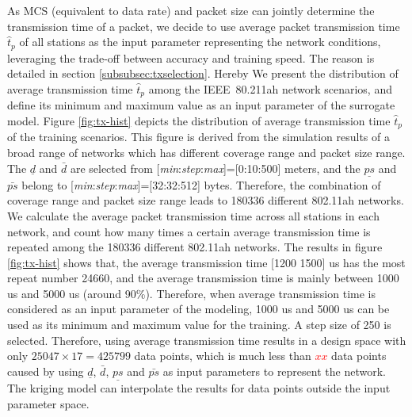 



As MCS (equivalent to data rate) and packet size can jointly determine the transmission time of a packet, we decide to use average packet transmission time $\hat{t}_p$ of all stations as the input parameter representing the network conditions, leveraging the trade-off between accuracy and training speed. %
The reason is detailed in section \ref{subsubsec:txselection}. Hereby We present the distribution of average transmission time $\hat{t}_p$ among the IEEE~80.211ah network scenarios, and define its minimum and maximum value as an input parameter of the surrogate model. Figure \ref{fig:tx-hist} depicts the 
distribution of average transmission time $\hat{t}_p$ of the training scenarios.  This figure is derived from the simulation results of a broad range of networks which has different coverage range and packet size range. The $\underline{d}$ and $\bar{d}$ are selected from [\textit{min}:\textit{step}:\textit{max}]=[0:10:500] meters, and the $\underline{ps}$ and $\bar{ps}$ belong to  [\textit{min}:\textit{step}:\textit{max}]=[32:32:512] bytes. Therefore, the combination of coverage range and packet size range  leads to 180336 different 802.11ah networks. We calculate the average packet transmission time across all stations in each network, and count how many times a certain average transmission time is repeated among the 180336 different 802.11ah networks.
 The results in figure \ref{fig:tx-hist} shows that, the average transmission time [1200 1500] us has the most repeat number 24660,  and the average transmission time is mainly between 1000 us and 5000 us (around 90\%). Therefore,  when average transmission time is considered as an input parameter of the modeling, 1000 us and 5000 us can be used as its minimum and maximum value for the training. A step size of 250 is selected. Therefore, using average transmission time results in a design space with only $25047 \times 17 = 425799$ data points, which is much less than  \textcolor{red}{$xx$} data points caused by using $\underline{d}$, $\bar{d}$, $\underline{ps}$ and $\bar{ps}$ as input parameters to represent the network. The kriging model can interpolate the results for data points outside the input parameter space.
 
